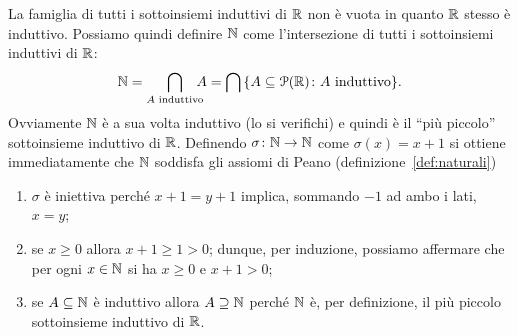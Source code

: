 La famiglia di tutti i sottoinsiemi induttivi di ${\mathbb R}$ non è vuota
in quanto ${\mathbb R}$ stesso è induttivo. 
Possiamo quindi definire ${\mathbb N}$ come l'intersezione
di tutti i sottoinsiemi induttivi di ${\mathbb R}$:
\[
    {\mathbb N} 
    = \bigcap_{A\text{ induttivo}} \!\!\!\!A 
    = \bigcap{\left\{ A\subseteq\mathcal P({\mathbb R})\colon A \text{ induttivo} \right\}}.
\]
Ovviamente ${\mathbb N}$ è a sua volta induttivo (lo si verifichi) 
e quindi è il ``più piccolo'' sottoinsieme induttivo di ${\mathbb R}$.
Definendo $\sigma\colon {\mathbb N}\to {\mathbb N}$ come $\sigma(x) = x+1$ 
si ottiene 
immediatamente che ${\mathbb N}$ soddisfa gli assiomi di Peano (definizione~\ref{def:naturali})
\begin{enumerate}
    \item $\sigma$ è iniettiva perché $x+1 = y+1$ implica, sommando $-1$ ad ambo i lati,
    $x=y$;
    \item se $x\ge 0$ allora $x+1 \ge 1 > 0$; dunque, per induzione, 
    possiamo affermare che per ogni $x\in {\mathbb N}$ si ha $x\ge 0$ e $x+1>0$;
    \item se $A \subseteq {\mathbb N}$ è induttivo allora $A \supseteq {\mathbb N}$ perché 
    ${\mathbb N}$ è, per definizione, il più piccolo sottoinsieme induttivo di ${\mathbb R}$.
\end{enumerate}
% 
% 
